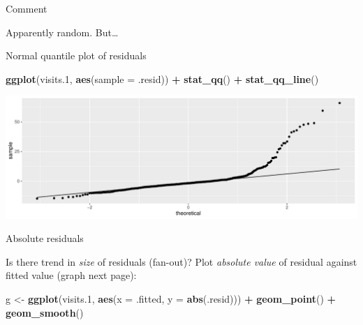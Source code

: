 \documentclass[
  ignorenonframetext,
]{beamer}
\newenvironment{Shaded}{\begin{snugshade}}{\end{snugshade}}
\newcommand{\DataTypeTok}[1]{\textcolor[rgb]{0.13,0.29,0.53}{#1}}
\newcommand{\FloatTok}[1]{\textcolor[rgb]{0.00,0.00,0.81}{#1}}
\newcommand{\KeywordTok}[1]{\textcolor[rgb]{0.13,0.29,0.53}{\textbf{#1}}}
\newcommand{\NormalTok}[1]{#1}
\newcommand{\OperatorTok}[1]{\textcolor[rgb]{0.81,0.36,0.00}{\textbf{#1}}}
\newcommand{\StringTok}[1]{\textcolor[rgb]{0.31,0.60,0.02}{#1}}
\begin{document}
\begin{frame}{Comment}
\protect\hypertarget{comment}{}

Apparently random. But\ldots

\end{frame}

\begin{frame}[fragile]{Normal quantile plot of residuals}
\protect\hypertarget{normal-quantile-plot-of-residuals}{}

\begin{Shaded}
\begin{Highlighting}[]
\KeywordTok{ggplot}\NormalTok{(visits}\FloatTok{.1}\NormalTok{, }\KeywordTok{aes}\NormalTok{(}\DataTypeTok{sample =}\NormalTok{ .resid)) }\OperatorTok{+}\StringTok{ }\KeywordTok{stat_qq}\NormalTok{() }\OperatorTok{+}\StringTok{ }\KeywordTok{stat_qq_line}\NormalTok{()}
\end{Highlighting}
\end{Shaded}

\includegraphics{slides_d29_files/figure-beamer/unnamed-chunk-58-1.pdf}

\end{frame}

\begin{frame}[fragile]{Absolute residuals}
\protect\hypertarget{absolute-residuals}{}

Is there trend in \emph{size} of residuals (fan-out)? Plot
\emph{absolute value} of residual against fitted value (graph next
page):

\begin{Shaded}
\begin{Highlighting}[]
\NormalTok{g <-}\StringTok{ }\KeywordTok{ggplot}\NormalTok{(visits}\FloatTok{.1}\NormalTok{, }\KeywordTok{aes}\NormalTok{(}\DataTypeTok{x =}\NormalTok{ .fitted, }\DataTypeTok{y =} \KeywordTok{abs}\NormalTok{(.resid))) }\OperatorTok{+}
\StringTok{  }\KeywordTok{geom_point}\NormalTok{() }\OperatorTok{+}\StringTok{ }\KeywordTok{geom_smooth}\NormalTok{()}
\end{Highlighting}
\end{Shaded}

\end{frame}
\end{document}
